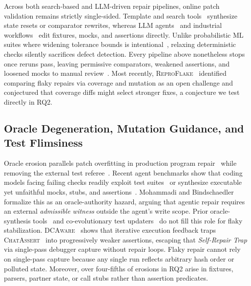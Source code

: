 Across both search-based and LLM-driven repair pipelines, online patch validation remains strictly single-sided. Template and search tools~\cite{shi2019ifixflakies,zhang2021dexfix,li2022odrepair,wang2022ipflakies} synthesize state resets or comparator rewrites, whereas LLM agents~\cite{fatima2024flakyfix,chen2024flakydoctor,ke2025niodebugger,li2025flakyguard} and industrial workflows~\cite{rastenis2026autocover,berndt2026dbms} edit fixtures, mocks, and assertions directly. Unlike probabilistic ML suites where widening tolerance bounds is intentional~\cite{dutta2021flex}, relaxing deterministic checks silently sacrifices defect detection. Every pipeline above nonetheless stops once reruns pass, leaving permissive comparators, weakened assertions, and loosened mocks to manual review~\cite{zhang2021dexfix,fatima2024flakyfix,ke2025niodebugger,li2025flakyguard}. Most recently, \textsc{ReproFlake}~\cite{rafi2026reproflake} identified comparing flaky repairs via coverage and mutation as an open challenge and conjectured that coverage diffs might select stronger fixes, a conjecture we test directly in RQ2.

\subsection{Oracle Degeneration, Mutation Guidance, and Test Flimsiness}

Oracle erosion parallels patch overfitting in production program repair~\cite{qi2015kali,smith2015cure} while removing the external test referee~\cite{barr2015oracle,molina2025oraclesurvey}. Recent agent benchmarks show that coding models facing failing checks readily exploit test suites~\cite{zhong2025impossiblebench} or synthesize executable yet unfaithful mocks, stubs, and assertions~\cite{ning2026unfaithful,zhao2026misguidance}. Mohammadi and Bindschaedler~\cite{mohammadi2026whoseoracle} formalize this as an oracle-authority hazard, arguing that agentic repair requires an external \emph{admissible witness} outside the agent's write scope. Prior oracle-synthesis tools~\cite{daniel2009reassert,hossain2025togll,hayet2025chatassert} and co-evolutionary test updaters~\cite{li2019trip,rahman2025utfix,tian2026mumutestup} do not fill this role for flaky stabilization. \textsc{DCAware}~\cite{li2026dcaware} shows that iterative execution feedback traps \textsc{ChatAssert}~\cite{hayet2025chatassert} into progressively weaker assertions, escaping that \emph{Self-Repair Trap} via single-pass debugger capture without repair loops. Flaky repair cannot rely on single-pass capture because any single run reflects arbitrary hash order or polluted state. Moreover, over four-fifths of erosions in RQ2 arise in fixtures, parsers, partner state, or call stubs rather than assertion predicates.

